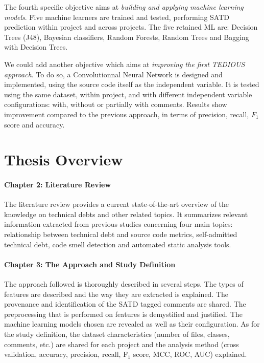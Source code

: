 The fourth specific objective aims at \emph{building and applying machine learning models}. Five machine learners are trained and tested, performing \ac{SATD} prediction within project and across projects. The five retained ML are: Decision Trees (J48), Bayesian classifiers, Random Forests, Random Trees and Bagging with Decision Trees. \par

We could add another objective which aims at \emph{improving the first TEDIOUS approach}. To do so, a Convolutionnal Neural Network is designed and implemented, using the source code itself as the independent variable. It is tested using the same dataset, within project, and with different independent variable configurations: with, without or partially with comments. Results show improvement compared to the previous approach, in terms of precision, recall, $F_1$ score and accuracy.

\section{Thesis Overview}  


\paragraph{Chapter 2: Literature Review}
The literature review provides a current state-of-the-art overview of the knowledge on technical debts and other related topics. It summarizes relevant information extracted from previous studies concerning four main topics: relationship between technical debt and source code metrics, self-admitted technical debt, code smell detection and automated static analysis tools.

\paragraph{Chapter 3: The Approach and Study Definition}
The approach followed is thoroughly described in several steps. The types of features are described and the way they are extracted is explained. The provenance and identification of the \ac{SATD} tagged comments are shared. The preprocessing that is performed on features is demystified and justified. The machine learning models chosen are revealed as well as their configuration. As for the study definition, the dataset characteristics (number of files, classes, comments, etc.) are shared for each project and the analysis method (cross validation, accuracy, precision, recall, F$_{1}$ score, \ac{MCC}, \ac{ROC}, \ac{AUC}) explained.

